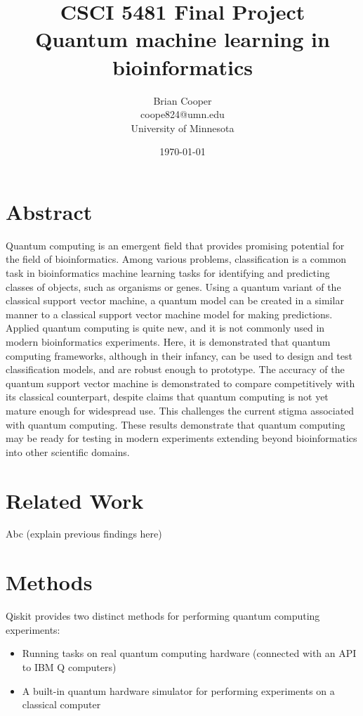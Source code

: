 \documentclass{article}
\title{%
  CSCI 5481 Final Project \\
  \large Quantum machine learning in bioinformatics
}
\author{Brian Cooper \\ coope824@umn.edu \\ University of Minnesota}
\date{\today}
\begin{document}
\maketitle

\section{Abstract}
  Quantum computing is an emergent field that provides promising potential for the field of bioinformatics. Among various problems, classification is a common task in bioinformatics machine learning tasks for identifying and predicting classes of objects, such as organisms or genes. Using a quantum variant of the classical support vector machine, a quantum model can be created in a similar manner to a classical support vector machine model for making predictions. Applied quantum computing is quite new, and it is not commonly used in modern bioinformatics experiments. Here, it is demonstrated that quantum computing frameworks, although in their infancy, can be used to design and test classification models, and are robust enough to prototype. The accuracy of the quantum support vector machine is demonstrated to compare competitively with its classical counterpart, despite claims that quantum computing is not yet mature enough for widespread use. This challenges the current stigma associated with quantum computing. These results demonstrate that quantum computing may be ready for testing in modern experiments extending beyond bioinformatics into other scientific domains.

\section{Related Work}
  Abc (explain previous findings here)

\section{Methods}
  Qiskit provides two distinct methods for performing quantum computing experiments:

    \begin{itemize}
      \item{Running tasks on real quantum computing hardware (connected with an API to IBM Q computers)}
      \item{A built-in quantum hardware simulator for performing experiments on a classical computer}
    \end{itemize}
\end{document}
